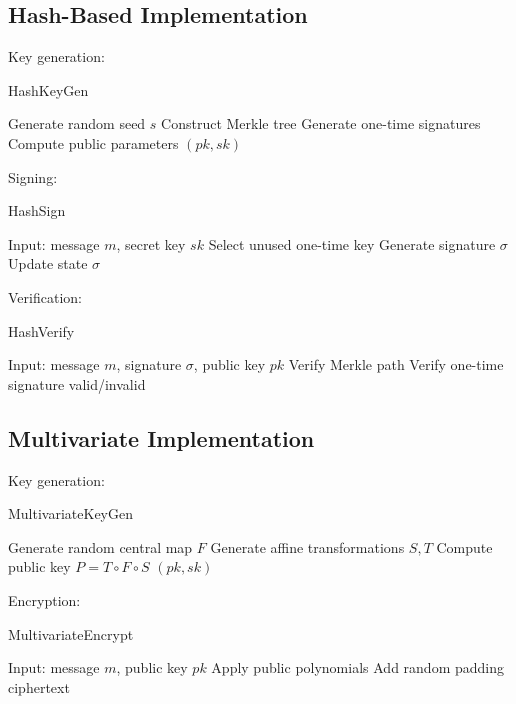 \documentclass[12pt]{article}
\begin{document}
\subsection{Hash-Based Implementation}

Key generation:

\begin{algorithm}
\caption{HashKeyGen}
\begin{algorithmic}[1]
\STATE Generate random seed $s$
\STATE Construct Merkle tree
\STATE Generate one-time signatures
\STATE Compute public parameters
\RETURN $(pk, sk)$
\end{algorithmic}
\end{algorithm}

Signing:

\begin{algorithm}
\caption{HashSign}
\begin{algorithmic}[1]
\STATE Input: message $m$, secret key $sk$
\STATE Select unused one-time key
\STATE Generate signature $\sigma$
\STATE Update state
\RETURN $\sigma$
\end{algorithmic}
\end{algorithm}

Verification:

\begin{algorithm}
\caption{HashVerify}
\begin{algorithmic}[1]
\STATE Input: message $m$, signature $\sigma$, public key $pk$
\STATE Verify Merkle path
\STATE Verify one-time signature
\RETURN valid/invalid
\end{algorithmic}
\end{algorithm}

\subsection{Multivariate Implementation}

Key generation:

\begin{algorithm}
\caption{MultivariateKeyGen}
\begin{algorithmic}[1]
\STATE Generate random central map $F$
\STATE Generate affine transformations $S,T$
\STATE Compute public key $P = T \circ F \circ S$
\RETURN $(pk, sk)$
\end{algorithmic}
\end{algorithm}

Encryption:

\begin{algorithm}
\caption{MultivariateEncrypt}
\begin{algorithmic}[1]
\STATE Input: message $m$, public key $pk$
\STATE Apply public polynomials
\STATE Add random padding
\RETURN ciphertext
\end{algorithmic}
\end{algorithm}
\end{document}
